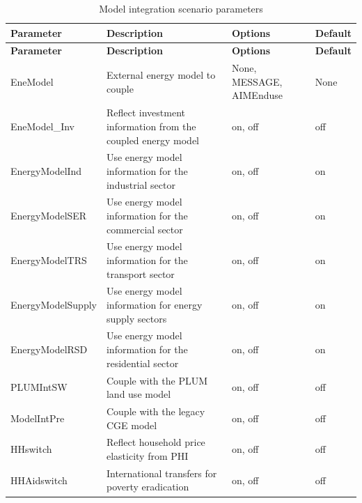 \documentclass[10pt,a4paper,titlepage,dvipdfmx]{book}
\begin{document}
\begin{longtable}{|p{}|p{}|p{}|p{}|}
\caption{Model integration scenario parameters}\label{tab:sp-modelint}\\
\hline
\textbf{Parameter} & \textbf{Description} & \textbf{Options} & \textbf{Default} \\ \hline
\endfirsthead
\hline
\textbf{Parameter} & \textbf{Description} & \textbf{Options} & \textbf{Default} \\ \hline
\endhead
\hline
\endfoot
EneModel & External energy model to couple & None, MESSAGE, AIMEnduse & None \\ \hline
EneModel\_Inv & Reflect investment information from the coupled energy model & on, off & off \\ \hline
EnergyModelInd & Use energy model information for the industrial sector & on, off & on \\ \hline
EnergyModelSER & Use energy model information for the commercial sector & on, off & on \\ \hline
EnergyModelTRS & Use energy model information for the transport sector & on, off & on \\ \hline
EnergyModelSupply & Use energy model information for energy supply sectors & on, off & on \\ \hline
EnergyModelRSD & Use energy model information for the residential sector & on, off & on \\ \hline
PLUMIntSW & Couple with the PLUM land use model & on, off & off \\ \hline
ModelIntPre & Couple with the legacy CGE model & on, off & off \\ \hline
HHswitch & Reflect household price elasticity from PHI & on, off & off \\ \hline
HHAidswitch & International transfers for poverty eradication & on, off & off \\ \hline
\end{longtable}
\end{document}

